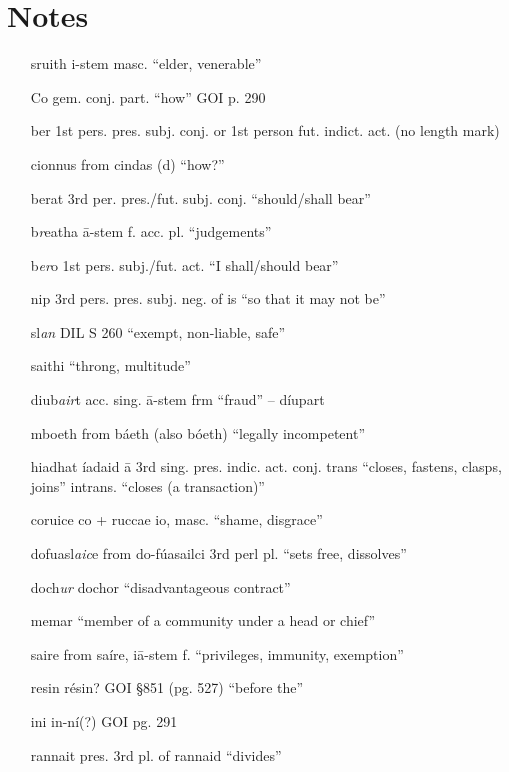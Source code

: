 \documentclass[11pt]{article}
\begin{document}
\section{Notes}

\begin{enumerate}
  \item[sruith] i-stem masc. \enquote{elder, venerable}
  \item[Co] gem. conj. part. \enquote{how} GOI p. 290
  \item[ber] 1st pers. pres. subj. conj. or 1st person fut. indict. act. (no length mark)
  \item[cionnus] from cindas (d) \enquote{how?}
  \item[berat] 3rd per. pres./fut. subj. conj. \enquote{should/shall bear}
  \item[b\emph{r}eatha] \={a}-stem f. acc. pl. \enquote{judgements}
  \item[b\emph{er}o] 1st pers. subj./fut. act. \enquote{I shall/should bear} 
  \item[nip] 3rd pers. pres. subj. neg. of is \enquote{so that it may not be}
  \item[sl\emph{an}] DIL S 260 \enquote{exempt, non-liable, safe}
  \item[saithi] \enquote{throng, multitude}
  \item[diub\emph{air}t] acc. sing. \={a}-stem frm \enquote{fraud} -- d\'{i}upart
  \item[mboeth] from b\'{a}eth (also b\'{o}eth) \enquote{legally incompetent}
  \item[hiadhat] \'{i}adaid \={a} 3rd sing. pres. indic. act. conj. trans \enquote{closes, fastens, clasps, joins} intrans. \enquote{closes (a transaction)}
  \item[coruice] co + ruccae io, masc. \enquote{shame, disgrace}
  \item[dofuasl\emph{aic}e] from do-f\'{u}asailci 3rd perl pl. \enquote{sets free, dissolves}
  \item[doch\emph{ur}] dochor \enquote{disadvantageous contract}
  \item[memar] \enquote{member of a community under a head or chief}
  \item[saire] from sa\'{i}re, i\={a}-stem f. \enquote{privileges, immunity, exemption}
  \item[resin] r\'{e}sin? GOI \S 851 (pg. 527) \enquote{before the}
  \item[ini] in-n\'{i}(?) GOI pg. 291
  \item[rannait] pres. 3rd pl. of rannaid \enquote{divides}

\end{enumerate}
\end{document}
